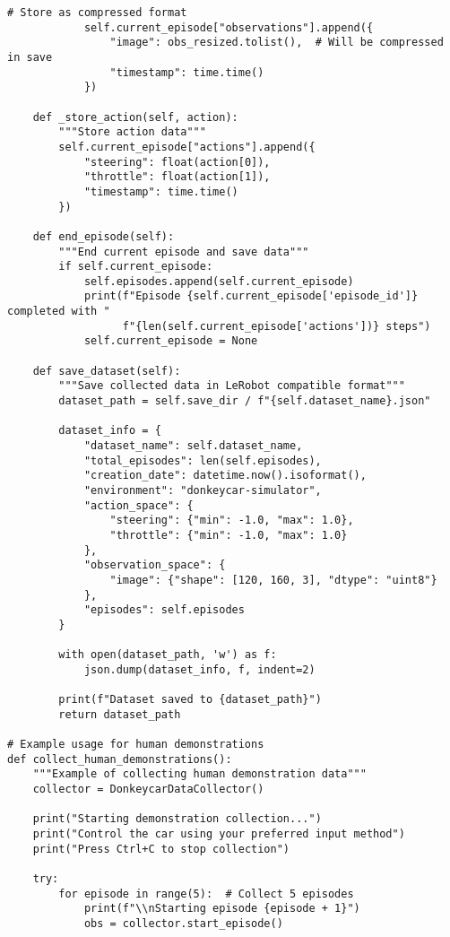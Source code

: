 \documentclass[11pt,a4paper]{article}
\begin{document}
\begin{lstlisting}[style=pythonstyle, caption={Data collection for LeRobot (collect\_demonstrations.py)}]
            # Store as compressed format
            self.current_episode["observations"].append({
                "image": obs_resized.tolist(),  # Will be compressed in save
                "timestamp": time.time()
            })
    
    def _store_action(self, action):
        """Store action data"""
        self.current_episode["actions"].append({
            "steering": float(action[0]),
            "throttle": float(action[1]),
            "timestamp": time.time()
        })
    
    def end_episode(self):
        """End current episode and save data"""
        if self.current_episode:
            self.episodes.append(self.current_episode)
            print(f"Episode {self.current_episode['episode_id']} completed with "
                  f"{len(self.current_episode['actions'])} steps")
            self.current_episode = None
    
    def save_dataset(self):
        """Save collected data in LeRobot compatible format"""
        dataset_path = self.save_dir / f"{self.dataset_name}.json"
        
        dataset_info = {
            "dataset_name": self.dataset_name,
            "total_episodes": len(self.episodes),
            "creation_date": datetime.now().isoformat(),
            "environment": "donkeycar-simulator",
            "action_space": {
                "steering": {"min": -1.0, "max": 1.0},
                "throttle": {"min": -1.0, "max": 1.0}
            },
            "observation_space": {
                "image": {"shape": [120, 160, 3], "dtype": "uint8"}
            },
            "episodes": self.episodes
        }
        
        with open(dataset_path, 'w') as f:
            json.dump(dataset_info, f, indent=2)
        
        print(f"Dataset saved to {dataset_path}")
        return dataset_path

# Example usage for human demonstrations
def collect_human_demonstrations():
    """Example of collecting human demonstration data"""
    collector = DonkeycarDataCollector()
    
    print("Starting demonstration collection...")
    print("Control the car using your preferred input method")
    print("Press Ctrl+C to stop collection")
    
    try:
        for episode in range(5):  # Collect 5 episodes
            print(f"\\nStarting episode {episode + 1}")
            obs = collector.start_episode()
            

\end{lstlisting}
\end{document}
